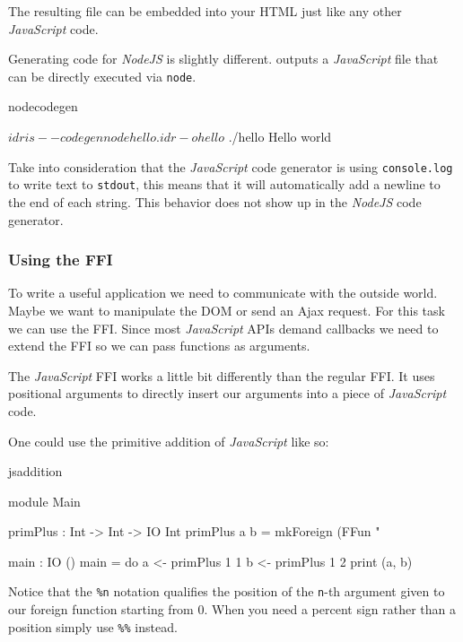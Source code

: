 \noindent
The resulting file can be embedded into your HTML just like any other
\emph{JavaScript} code.

\noindent
Generating code for \emph{NodeJS} is slightly different. \Idris{} outputs
a \emph{JavaScript} file that can be directly executed via \texttt{node}.

\begin{SaveVerbatim}{nodecodegen}

$ idris --codegen node hello.idr -o hello
$ ./hello
Hello world

\end{SaveVerbatim}

\noindent
Take into consideration that the \emph{JavaScript} code generator is using
\texttt{console.log} to write text to \texttt{stdout}, this means that it will
automatically add a newline to the end of each string. This behavior
does not show up in the \emph{NodeJS} code generator.

\subsubsection*{Using the FFI}

\noindent
To write a useful application we need to communicate with the outside
world. Maybe we want to manipulate the DOM or send an Ajax request. For this
task we can use the FFI. Since most \emph{JavaScript} APIs demand callbacks
we need to extend the FFI so we can pass functions as arguments.

\noindent
The \emph{JavaScript} FFI works a little bit differently than the regular FFI.
It uses positional arguments to directly insert our arguments into a piece
of \emph{JavaScript} code.

\noindent
One could use the primitive addition of \emph{JavaScript} like so:

\begin{SaveVerbatim}{jsaddition}

module Main

primPlus : Int -> Int -> IO Int
primPlus a b = mkForeign (FFun "%

main : IO ()
main = do
  a <- primPlus 1 1
  b <- primPlus 1 2
  print (a, b)

\end{SaveVerbatim}

\noindent
Notice that the \texttt{\%n} notation qualifies the position of the
\texttt{n}-th argument given to our foreign function starting from 0. When
you need a percent sign rather than a position simply use \texttt{\%\%}
instead.

